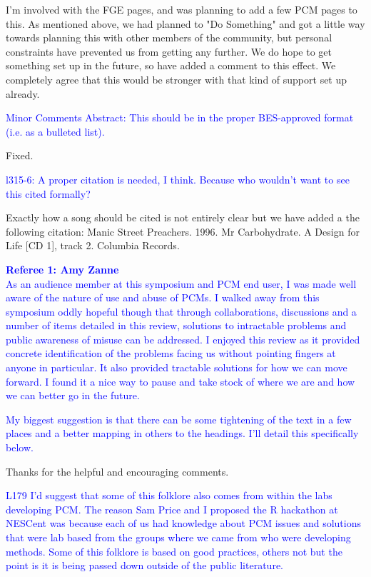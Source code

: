 \documentclass[12pt]{letter}
\begin{document}
\begin{letter}{}
I'm involved with the FGE pages, and was planning to add a few PCM pages to this. As mentioned above, we had planned to "Do Something" and got a little way towards planning this with other members of the community, but personal constraints have prevented us from getting any further. We do hope to get something set up in the future, so have added a comment to this effect. We completely agree that this would be stronger with that kind of support set up already.

\textcolor{blue}{Minor Comments
Abstract: This should be in the proper BES-approved format (i.e. as a bulleted list).}

Fixed.

\textcolor{blue}{l315-6: A proper citation is needed, I think. Because who wouldn't want to see this cited formally?}

Exactly how a song should be cited is not entirely clear but we have added a the following citation: Manic Street Preachers. 1996. Mr Carbohydrate. A Design for Life [CD 1], track 2. Columbia Records.

\textcolor{blue}{\textbf{Referee 1: Amy Zanne}}\\

\textcolor{blue}{As an audience member at this symposium and PCM end user, I was made well aware of the nature of use and abuse of PCMs. I walked away from this symposium oddly hopeful though that through collaborations, discussions and a number of items detailed in this review, solutions to intractable problems and public awareness of misuse can be addressed. I enjoyed this review as it provided concrete identification of the problems facing us without pointing fingers at anyone in particular. It also provided tractable solutions for how we can move forward. I found it a nice way to pause and take stock of where we are and how we can better go in the future.}

\textcolor{blue}{My biggest suggestion is that there can be some tightening of the text in a few places and a better mapping in others to the headings. I'll detail this specifically below.}

Thanks for the helpful and encouraging comments.

\textcolor{blue}{L179 I'd suggest that some of this folklore also comes from within the labs developing PCM. The reason Sam Price and I proposed the R hackathon at NESCent was because each of us had knowledge about PCM issues and solutions that were lab based from the groups where we came from who were developing methods. Some of this folklore is based on good practices, others not but the point is it is being passed down outside of the public literature.}


\end{letter}
\end{document}
